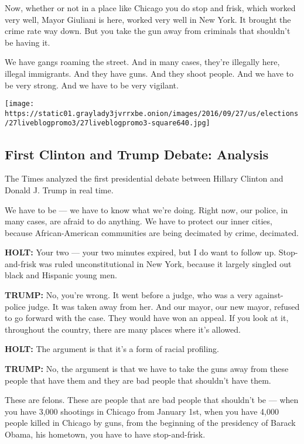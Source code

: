 Now, whether or not in a place like Chicago you do stop and frisk, which
worked very well, Mayor Giuliani is here, worked very well in New York.
It brought the crime rate way down. But you take the gun away from
criminals that shouldn't be having it.

We have gangs roaming the street. And in many cases, they're illegally
here, illegal immigrants. And they have guns. And they shoot people. And
we have to be very strong. And we have to be very vigilant.

\href{https://www.nytimes3xbfgragh.onion/interactive/2016/09/26/us/elections/donald-trump-hillary-clinton-debate.html}{}

\texttt{[image: https://static01.graylady3jvrrxbe.onion/images/2016/09/27/us/elections/27liveblogpromo3/27liveblogpromo3-square640.jpg]}

\hypertarget{first-clinton-and-trump-debate-analysis}{%
\subsection{First Clinton and Trump Debate:
Analysis}\label{first-clinton-and-trump-debate-analysis}}

The Times analyzed the first presidential debate between Hillary Clinton
and Donald J. Trump in real time.

We have to be --- we have to know what we're doing. Right now, our
police, in many cases, are afraid to do anything. We have to protect our
inner cities, because African-American communities are being decimated
by crime, decimated.

\textbf{HOLT:} Your two --- your two minutes expired, but I do want to
follow up. Stop-and-frisk was ruled unconstitutional in New York,
because it largely singled out black and Hispanic young men.

\textbf{TRUMP:} No, you're wrong. It went before a judge, who was a very
against-police judge. It was taken away from her. And our mayor, our new
mayor, refused to go forward with the case. They would have won an
appeal. If you look at it, throughout the country, there are many places
where it's allowed.

\textbf{HOLT:} The argument is that it's a form of racial profiling.

\textbf{TRUMP:} No, the argument is that we have to take the guns away
from these people that have them and they are bad people that shouldn't
have them.

These are felons. These are people that are bad people that shouldn't be
--- when you have 3,000 shootings in Chicago from January 1st, when you
have 4,000 people killed in Chicago by guns, from the beginning of the
presidency of Barack Obama, his hometown, you have to have
stop-and-frisk.

